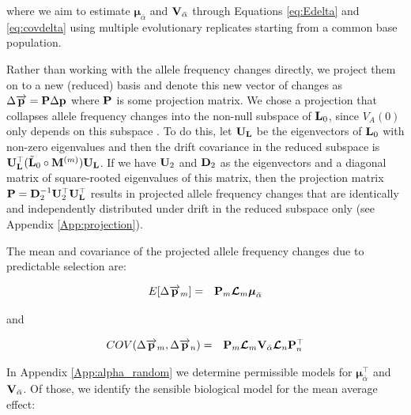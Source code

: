 \documentclass[12pt]{article}
\begin{document}
\begin{bibunit}
where we aim to estimate $\boldsymbol{\mu}_{\bar{\alpha}}$ and ${\bf V}_{\bar{\alpha}}$ through Equations \ref{eq:Edelta} and \ref{eq:covdelta} using multiple evolutionary replicates starting from a common base population.

Rather than working with the allele frequency changes directly, we project them on to a new (reduced) basis and denote this new vector of changes as $\Delta\overrightarrow{\bf p} = {\bf P}\Delta{\bf p}$ where ${\bf P}$ is some projection matrix. We chose a projection that collapses allele frequency changes into the non-null subspace of ${\bf L}_{0}$, since $V_A(0)$ only depends on this subspace \citep{de2015genomic}. To do this, let ${\bf U}_{\bf L}$ be the eigenvectors of ${\bf L}_{0}$ with non-zero eigenvalues and then the drift covariance in the reduced subspace is ${\bf U}_{\bf L}^{\top}(\tilde{\bf L}_{0}\circ{\bf M}^{(m)}){\bf U}_{\bf L}$. If we have ${\bf U}_2$ and ${\bf D}_2$ as the eigenvectors and a diagonal matrix of square-rooted eigenvalues of this matrix, then the projection matrix ${\bf P} = {\bf D}_2^{-1}{\bf U}_2^{\top}{\bf U}_{\bf L}^{\top}$ results in projected allele frequency changes that are identically and independently distributed under drift in the reduced subspace only (see Appendix \ref{App:projection}).

The mean and covariance of the projected allele frequency changes due to predictable selection are:

\begin{equation} 
\begin{array}{rl}
E[\Delta \overrightarrow{\bf p}_m] = &
{\bf P}_{m}\boldsymbol{\mathcal{L}}_m
\boldsymbol{\mu}_{\bar{\alpha}}
\end{array}
\end{equation}

and 

\begin{equation} 
\begin{array}{rl}
COV(\Delta \overrightarrow{\bf p}_m, \Delta \overrightarrow{\bf p}_n) = &
{\bf P}_{m}\boldsymbol{\mathcal{L}}_m{\bf V}_{\bar{\alpha}}
\boldsymbol{\mathcal{L}}_n{\bf P}^{\top}_{n}
\end{array}
\end{equation}

In Appendix \ref{App:alpha_random} we determine permissible models for $\boldsymbol{\mu}_{\bar{\alpha}}^{\top}$ and ${\bf V}_{\bar{\alpha}}$.  Of those, we identify the sensible biological model for the mean average effect:


\end{bibunit}
\end{document}
